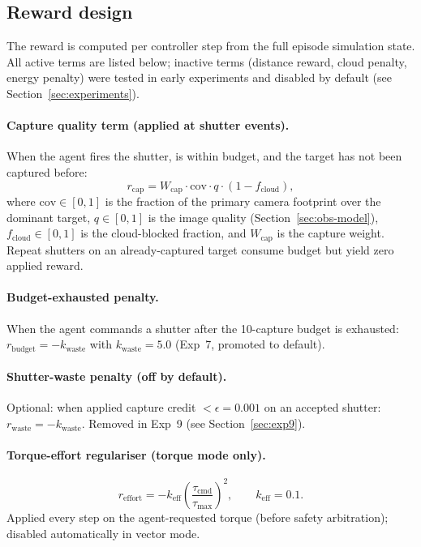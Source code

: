 \subsection{Reward design}
\label{sec:reward}

The reward is computed per controller step from the full episode simulation state.
All active terms are listed below; inactive terms (distance reward, cloud penalty, energy penalty) were tested in early experiments and disabled by default (see Section~\ref{sec:experiments}).

\paragraph{Capture quality term (applied at shutter events).}
When the agent fires the shutter, is within budget, and the target has not been captured before:
\begin{equation}
  r_\text{cap} = W_\text{cap}\cdot\text{cov}\cdot q\cdot(1 - f_\text{cloud}),
  \label{eq:r-cap}
\end{equation}
where $\text{cov}\in[0,1]$ is the fraction of the primary camera footprint over the dominant target,
$q\in[0,1]$ is the image quality (Section~\ref{sec:obs-model}),
$f_\text{cloud}\in[0,1]$ is the cloud-blocked fraction, and
$W_\text{cap}$ is the capture weight.
Repeat shutters on an already-captured target consume budget but yield zero applied reward.

\paragraph{Budget-exhausted penalty.}
When the agent commands a shutter after the 10-capture budget is exhausted:
$r_\text{budget} = -k_\text{waste}$ with $k_\text{waste}=5.0$ (Exp~7, promoted to default).

\paragraph{Shutter-waste penalty (off by default).}
Optional: when applied capture credit $< \epsilon = 0.001$ on an accepted shutter:
$r_\text{waste} = -k_\text{waste}$. Removed in Exp~9 (see Section~\ref{sec:exp9}).

\paragraph{Torque-effort regulariser (torque mode only).}
\begin{equation}
  r_\text{effort} = -k_\text{eff}\left(\frac{\tau_\text{cmd}}{\tau_\text{max}}\right)^2,
  \qquad k_\text{eff}=0.1.
\end{equation}
Applied every step on the agent-requested torque (before safety arbitration); disabled automatically in vector mode.

